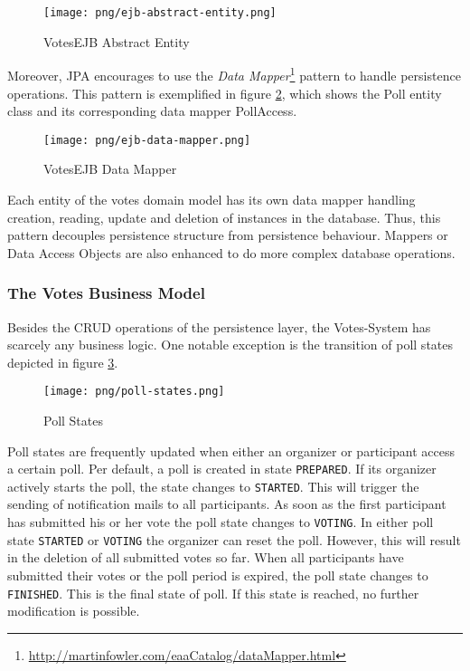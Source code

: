 \begin{figure}[h]
\centering
\texttt{[image: png/ejb-abstract-entity.png]}
\caption{VotesEJB Abstract Entity}
\label{figure:ejb-abstract-entity}
\end{figure}

Moreover, JPA encourages to use the \textit{Data Mapper}\footnote{\url{http://martinfowler.com/eaaCatalog/dataMapper.html}} pattern to handle persistence operations.
This pattern is exemplified in figure \ref{figure:ejb-data-mapper}, which shows the Poll entity class and its corresponding data mapper PollAccess.

\begin{figure}[h]
\centering
\texttt{[image: png/ejb-data-mapper.png]}
\caption{VotesEJB Data Mapper}
\label{figure:ejb-data-mapper}
\end{figure}

Each entity of the votes domain model has its own data mapper handling creation, reading, update and deletion of instances in the database.
Thus, this pattern decouples persistence structure from persistence behaviour. 
Mappers or Data Access Objects are also enhanced to do more complex database operations.

\subsubsection{The Votes Business Model}
\label{subsubsec:the-votes-business-model}
Besides the CRUD operations of the persistence layer, the Votes-System has scarcely any business logic.
One notable exception is the transition of poll states depicted in figure \ref{figure:poll-states}.

\begin{figure}[h]
\centering
\texttt{[image: png/poll-states.png]}
\caption{Poll States}
\label{figure:poll-states}
\end{figure}

Poll states are frequently updated when either an organizer or participant access a certain poll.
Per default, a poll is created in state \texttt{PREPARED}.
If its organizer actively starts the poll, the state changes to \texttt{STARTED}.
This will trigger the sending of notification mails to all participants.
As soon as the first participant has submitted his or her vote the poll state changes to \texttt{VOTING}.
In either poll state \texttt{STARTED} or \texttt{VOTING} the organizer can reset the poll.
However, this will result in the deletion of all submitted votes so far.
When all participants have submitted their votes or the poll period is expired, the poll state changes to \texttt{FINISHED}.
This is the final state of poll.
If this state is reached, no further modification is possible.

